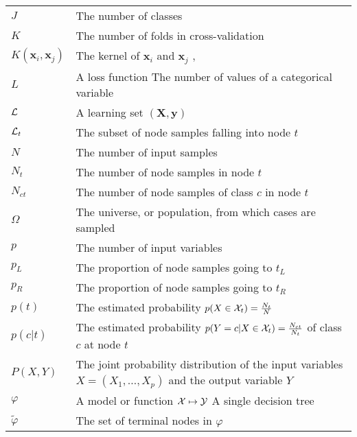 \begin{tabularx}{\textwidth}{ l X }
$J$ & The number of classes \dotfill  \pageref{ntn:J}\\
$K$ & The number of folds in cross-validation \dotfill  \pageref{ntn:K-cv}\\
$K(\mathbf{x}_i, \mathbf{x}_j)$ & The kernel of $\mathbf{x}_i$ and $\mathbf{x}_j$ \dotfill \pageref{ntn:kernel}, \pageref{ntn:kernel2}\\
$L$ & A loss function \dotfill  \pageref{ntn:L}\newline The number of values of a categorical variable \dotfill \pageref{ntn:L2}\\
${\cal L}$ & A learning set $(\mathbf{X}, \mathbf{y})$ \dotfill  \pageref{ntn:learning-set}\\
${\cal L}_t$ & The subset of node samples falling into node $t$ \dotfill  \pageref{ntn:L_t}\\
$N$ & The number of input samples \dotfill  \pageref{ntn:N}\\
$N_t$ & The number of node samples in node $t$ \dotfill  \pageref{ntn:N_t}\\
$N_{ct}$ & The number of node samples of class $c$ in node $t$ \dotfill  \pageref{ntn:N_ct}\\
$\Omega$ & The universe, or population, from which cases are sampled \dotfill  \pageref{ntn:omega}\\
$p$ & The number of input variables \dotfill  \pageref{ntn:p}\\
$p_L$ & The proportion of node samples going to $t_L$ \dotfill  \pageref{ntn:p_L}\\
$p_R$ & The proportion of node samples going to $t_R$ \dotfill  \pageref{ntn:p_R}\\
$p(t)$ & The estimated probability $p(X \in {\cal X}_t)=\tfrac{N_t}{N}$ \dotfill  \pageref{ntn:p_t}\\
$p(c|t)$ & The estimated probability $p(Y=c | X \in {\cal X}_t)=\tfrac{N_{ct}}{N_t}$ of class $c$ at node $t$ \dotfill  \pageref{ntn:p_ct}\\
$P(X,Y)$ & The joint probability distribution of the input variables $X=(X_1,\dots,X_p)$ and the output variable $Y$ \dotfill  \pageref{ntn:P_XY}\\
$\varphi$ & A model or function ${\cal X} \mapsto {\cal Y}$ \dotfill  \pageref{ntn:varphi}\newline A single decision tree \dotfill  \pageref{ntn:tree}\\
$\widetilde{\varphi}$ & The set of terminal nodes in $\varphi$ \dotfill  \pageref{ntn:varphi-leafs}\\

\end{tabularx}

